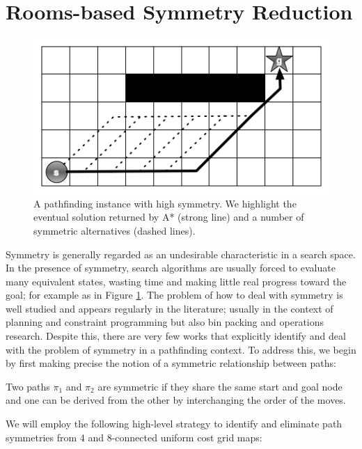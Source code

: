 \section{Rooms-based Symmetry Reduction}
\begin{figure}[]
       \begin{center}
                       \includegraphics[scale=0.40]{diagrams/symmetry_example.png}
       \end{center}
       \caption{A pathfinding instance with high symmetry. We highlight the
eventual solution returned by A* (strong line) and a number of symmetric 
alternatives (dashed lines).}
       \label{fig-symmetry}
		\vspace{-0.5em}
\end{figure}
Symmetry is generally regarded as an undesirable characteristic in a search
space.
In the presence of symmetry, search algorithms are usually forced to evaluate 
many equivalent states, wasting time and making little real progress toward the
goal; for example as in Figure \ref{fig-symmetry}.
The problem of how to deal with symmetry is well studied and appears regularly
in the literature; usually in the context of planning and constraint programming
but also bin packing and operations research. 
Despite this, there are very few works that explicitly identify and deal with the 
problem of symmetry in a pathfinding context. To address this, we begin by first
making precise the notion of a symmetric relationship between paths:
\begin{definition}
Two paths $\pi_{1}$ and $\pi_{2}$ are symmetric if they share the same start and
goal node and one can be derived from the other by interchanging the order of the
moves.
\end{definition}

We will employ the following high-level strategy to
identify and eliminate path symmetries from 4 and 8-connected uniform cost grid maps:


